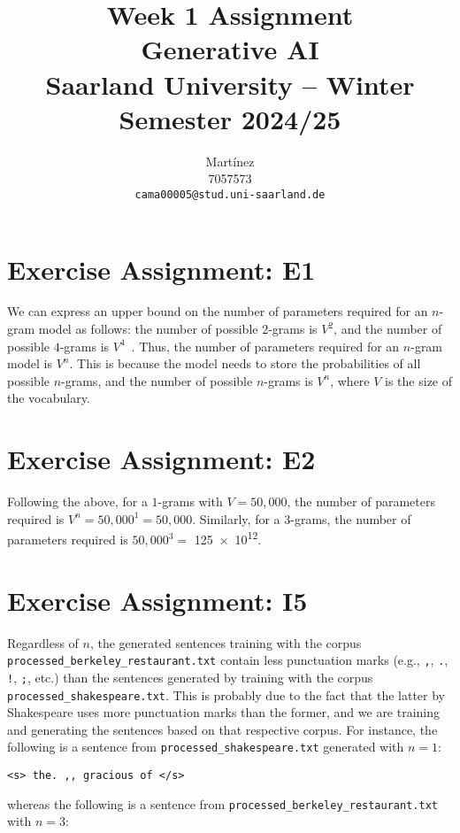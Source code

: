 \documentclass{article}
\title{Week 1 Assignment\\
\vspace{2mm}
\small{Generative AI}
\\
\vspace{2mm}
\small{Saarland University -- Winter Semester 2024/25}
}
\author{%
  Martínez \\
  7057573 \\
  \texttt{cama00005@stud.uni-saarland.de} \\
}
\begin{document}
\maketitle

\section{Exercise Assignment: E1}
We can express an upper bound on the number of parameters required for an $n$-gram model as follows: the number of possible $2$-grams is $V^2$, and the number of possible $4$-grams is $V^4$~\cite{jm3}. Thus, the number of parameters required for an $n$-gram model is $V^n$. This is because the model needs to store the probabilities of all possible $n$-grams, and the number of possible $n$-grams is $V^n$, where $V$ is the size of the vocabulary.

\section{Exercise Assignment: E2}
Following the above, for a $1$-grams with $V = 50{,}000$, the number of parameters required is $V^n = 50{,}000^1 = 50{,}000$. Similarly, for a $3$-grams, the number of parameters required is $50{,}000^3 = $ \num{125e12}.

\section{Exercise Assignment: I5}
Regardless of $n$, the generated sentences training with the corpus \texttt{processed\_berkeley\_restaurant.txt} contain less punctuation marks (e.g., \texttt{,}, \texttt{.}, \texttt{!}, \texttt{;}, etc.) than the sentences generated by training with the corpus \texttt{processed\_shakespeare.txt}. This is probably due to the fact that the latter by Shakespeare uses more punctuation marks than the former, and we are training and generating the sentences based on that respective corpus. For instance, the following is a sentence from \texttt{processed\_shakespeare.txt} generated with $n = 1$:

\begin{displayquote}
    \texttt{<s> the. ,, gracious of </s>}
\end{displayquote}

whereas the following is a sentence from \texttt{processed\_berkeley\_restaurant.txt} with $n = 3$:
\end{document}
